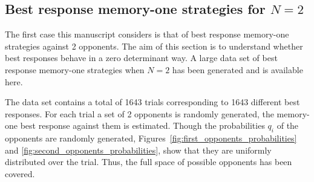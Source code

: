 \documentclass[10pt]{article}
\begin{document}
\subsection{Best response memory-one strategies for \(N=2\)}\label{subsection:best_response_n_2}

The first case this manuscript considers is that of best response memory-one
strategies against 2 opponents. The aim of this section is to understand whether
best responses behave in a zero determinant way. A large data set of best response
memory-one strategies when \(N=2\) has been generated and is available here. %

The data set contains a total of 1643 trials corresponding to 1643 different
best responses. For each trial a set of 2 opponents is randomly generated, the
memory-one best response against them is estimated. Though the probabilities
\(q_i\) of the opponents are randomly generated,
Figures~\ref{fig:first_opponents_probabilities} and
\ref{fig:second_opponents_probabilities}, show that they are uniformly
distributed over the trial. Thus, the full space of possible opponents has been
covered.
\end{document}
